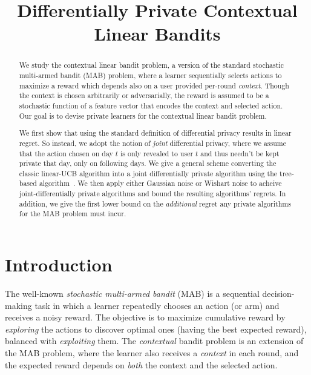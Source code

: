 \documentclass{article}
\title{Differentially Private Contextual Linear Bandits}
\begin{document}
\setlength{\intextsep}{4pt}
\setlength{\textfloatsep}{4pt}
\setlength{\abovedisplayskip}{3pt}
\setlength{\belowdisplayskip}{3pt}

\maketitle

\begin{abstract}
  We study the contextual linear bandit problem, a version of the
  standard stochastic multi-armed bandit (MAB) problem, where a learner
  sequentially selects actions to maximize a reward which
  depends also on a user provided per-round \emph{context}. Though the context
  is chosen arbitrarily or adversarially, the reward is assumed to
  be a stochastic function of a feature vector that encodes the
  context and selected action. Our goal is to devise private learners for the
  contextual linear bandit problem.

  We first show that using the standard definition of differential
  privacy results in linear regret. So instead, we adopt the notion of \emph{joint}
  differential privacy, where we assume that the action chosen on day
  $t$ is only revealed to user $t$ and thus needn't be kept private
  that day, only on following days. We give a general scheme
  converting the classic linear-UCB algorithm into a joint differentially
  private algorithm using the tree-based algorithm~\cite{ChanPrivateContinualRelease2010,DworkContinualObservation2010}.
  We then apply either Gaussian noise or Wishart noise to acheive joint-differentially private algorithms and bound the resulting algorithms' regrets. In addition, we give the first lower bound on the
  \emph{additional} regret any private algorithms for the MAB problem must incur.
 \end{abstract}

\section{Introduction}
\label{sec:introduction}

The well-known \emph{stochastic multi-armed bandit} (MAB) is a
sequential decision-making task in which a learner repeatedly chooses
an action (or arm) and receives a noisy reward.  The objective is to
maximize cumulative reward by \emph{exploring} the actions to discover
optimal ones (having the best expected reward), balanced with
\emph{exploiting} them.  The \emph{contextual} bandit problem is an
extension of the MAB problem, where the learner also receives a \emph{context} in
each round, and the expected reward depends on \emph{both} the context
and the selected action.
\end{document}
